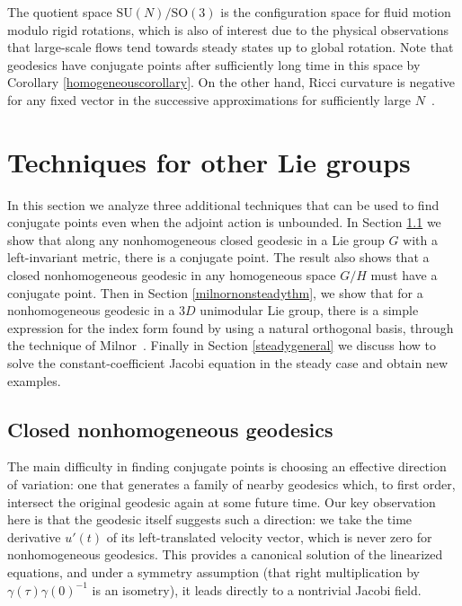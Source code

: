 \documentclass[oneside, 11pt]{amsart}
\numberwithin{equation}{section}
\begin{document}
The quotient space $\mathrm{SU}(N)/\mathrm{SO}(3)$ is the configuration space for fluid motion modulo rigid rotations, which is also of interest due to the physical observations that large-scale flows tend towards steady states up to global rotation. Note that geodesics have conjugate points after sufficiently long time in this space by Corollary \ref{homogeneouscorollary}.  On the other hand, Ricci curvature is negative for any fixed vector in the successive approximations for sufficiently large $N$~\cite{klasleandrosteve}.  

 
 

\section{Techniques for other Lie groups}\label{sec:noncompact}

In this section we analyze three additional techniques that can be used to find conjugate points even when the adjoint action is unbounded.
In Section \ref{closedgeodesicsection} we show that along any nonhomogeneous closed geodesic in a Lie group $G$ with a left-invariant metric, there is a conjugate point. The result also shows that a closed nonhomogeneous geodesic in any homogeneous space $G/H$ must have a conjugate point.  Then in Section \ref{milnornonsteadythm}, we show that for a nonhomogeneous geodesic in a $3D$ unimodular Lie group, there is a simple expression for the index form found by using a natural orthogonal basis, through the technique of Milnor~\cite{Milnor}. Finally in Section \ref{steadygeneral} we discuss how to solve the constant-coefficient Jacobi equation in the steady case and obtain new examples.



\subsection{Closed nonhomogeneous geodesics}\label{closedgeodesicsection}
 

The main difficulty in finding conjugate points is choosing an effective direction of variation: one that generates a family of nearby geodesics which, to first order, intersect the original geodesic again at some future time. Our key observation here is that the geodesic itself suggests such a direction: we take the time derivative $u'(t)$ of its left-translated velocity vector, which is never zero for nonhomogeneous geodesics. This provides a canonical solution of the linearized equations, and under a symmetry assumption (that right multiplication by $\gamma(\tau)\gamma(0)^{-1}$ is an isometry), it leads directly to a nontrivial Jacobi field.
\end{document}
